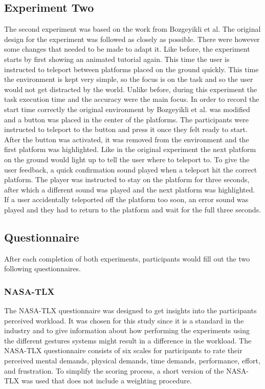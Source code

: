 \subsection{Experiment Two}
The second experiment was based on the work from Bozgeyikli et al. %
The original design for the experiment was followed as closely as possible. There were however some changes that needed to be made to adapt it. Like before, the experiment starts by first showing an animated tutorial again. This time the user is instructed to teleport between platforms placed on the ground quickly. This time the environment is kept very simple, so the focus is on the task and so the user would not get distracted by the world. Unlike before, during this experiment the task execution time and the accuracy were the main focus. In order to record the start time correctly the original environment by Bozgeyikli et al. was modified and a button was placed in the center of the platforms. The participants were instructed to teleport to the button and press it once they felt ready to start. After the button was activated, it was removed from the environment and the first platform was highlighted. Like in the original experiment the next platform on the ground would light up to tell the user where to teleport to. To give the user feedback, a quick confirmation sound played when a teleport hit the correct platform. The player was instructed to stay on the platform for three seconds, after which a different sound was played and the next platform was highlighted. If a user accidentally teleported off the platform too soon, an error sound was played and they had to return to the platform and wait for the full three seconds. 

\subsection{Questionnaire}
After each completion of both experiments, participants would fill out the two following questionnaires. 

\subsubsection{NASA-TLX}
The NASA-TLX questionnaire %
was designed to get insights into the participants perceived workload. It was chosen for this study since it is a standard in the industry and to give information about how performing the experiments using the different gestures systems might result in a difference in the workload. The NASA-TLX questionnaire consists of six scales for participants to rate their perceived mental demands, physical demands, time demands, performance, effort, and frustration. To simplify the scoring process, a short version of the NASA-TLX was used that does not include a weighting procedure. %

